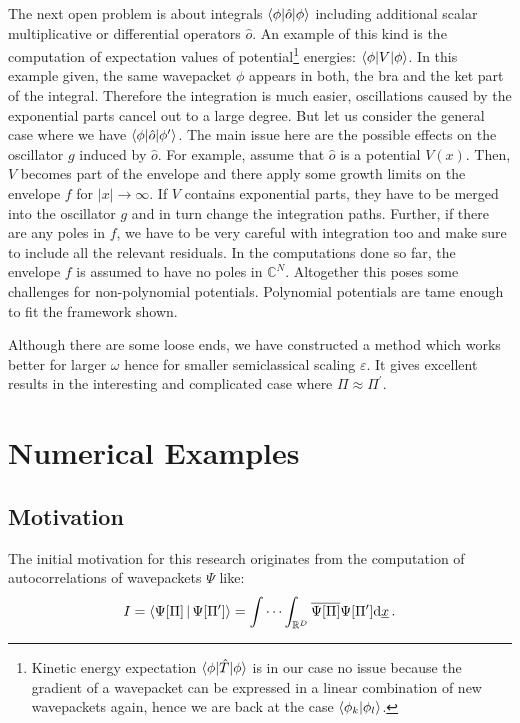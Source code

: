 \documentclass[a4paper,10pt]{article}
\begin{document}
The next open problem is about integrals $\braket{\phi|\hat{o}|\phi}$ including
additional scalar multiplicative or differential operators $\hat{o}$. An example
of this kind is the computation of expectation values of potential\footnote{Kinetic energy
expectation $\braket{\phi|\hat{T}|\phi}$ is in our case no issue because the
gradient of a wavepacket can be expressed in a linear combination of new wavepackets
again, hence we are back at the case $\braket{\phi_k|\phi_l}$.}
energies: $\braket{\phi|V|\phi}$.
In this example given, the same wavepacket $\phi$ appears in both, the bra and the
ket part of the integral. Therefore the integration is much easier, oscillations
caused by the exponential parts cancel out to a large degree. But let us consider
the general case where we have $\braket{\phi|\hat{o}|\phi^\prime}$. The main issue
here are the possible effects on the oscillator $g$ induced by $\hat{o}$. For example,
assume that $\hat{o}$ is a potential $V(x)$. Then, $V$ becomes part of the envelope
and there apply some growth limits on the envelope $f$ for $|x| \rightarrow \infty$.
If $V$ contains exponential parts, they have to be merged into the oscillator $g$ and
in turn change the integration paths. Further, if there are any poles
in $f$, we have to be very careful with integration too and make sure to include all
the relevant residuals. In the computations done so far, the envelope $f$ is assumed
to have no poles in $\mathbb{C}^{N}$. Altogether this poses some challenges for
non-polynomial potentials. Polynomial potentials are tame enough to
fit the framework shown.

Although there are some loose ends, we have constructed a method which works better
for larger $\omega$ hence for smaller semiclassical scaling $\varepsilon$.
It gives excellent results in the interesting and complicated case where
$\Pi \approx \Pi^{\prime}$.


\section{Numerical Examples}

\subsection{Motivation}


The initial motivation for this research originates from the computation of autocorrelations
of wavepackets $\Psi$ like:
\begin{equation}\label{eq:compute_ac_wavepackets}
  I = \Braket{\Psi[\Pi] | \Psi[\Pi^{\prime}]}
    = \idotsint_{\mathbb{R}^{D}} \overline{\Psi[\Pi]} \Psi[\Pi^{\prime}] \mathrm{d}\underline{x} \,.
\end{equation}
\end{document}
